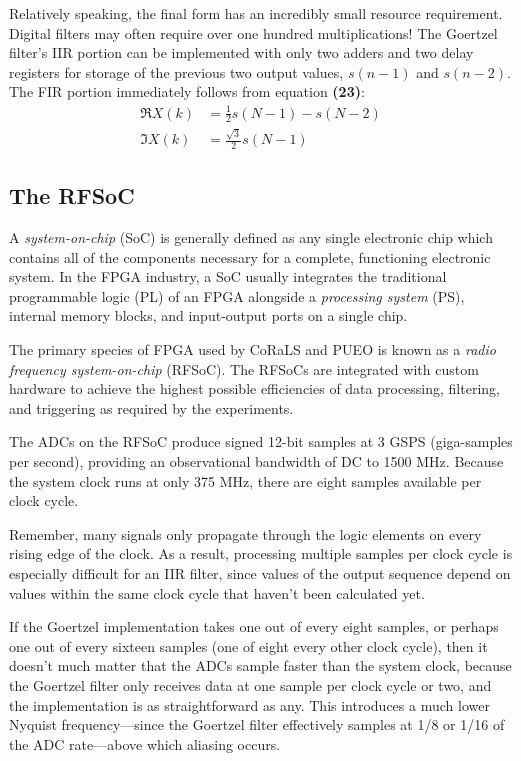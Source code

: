 \documentclass[reprint,amsmath,amssymb,aps,pra]{revtex4-2}
\begin{document}
Relatively speaking, the final form has an incredibly small resource requirement. Digital filters may often require over one hundred multiplications! The Goertzel filter's IIR portion can be implemented with only two adders and two delay registers for storage of the previous two output values, $s(n-1)$ and $s(n-2)$. The FIR portion immediately follows from equation \textbf{(23)}:
\begin{align}
    \Re{X(k)} & = \frac{1}{2} s(N-1) - s(N-2) \nonumber \\ 
    \Im{X(k)} & = \frac{\sqrt{3}}{2} s(N-1)
\end{align}

\subsection{The RFSoC}

A \textit{system-on-chip} (SoC) is generally defined as any single electronic chip which contains all of the components necessary for a complete, functioning electronic system. In the FPGA industry, a SoC usually integrates the traditional programmable logic (PL) of an FPGA alongside a \textit{processing system} (PS), internal memory blocks, and input-output ports on a single chip.

The primary species of FPGA used by CoRaLS and PUEO is known as a \textit{radio frequency system-on-chip} (RFSoC). The RFSoCs are integrated with custom hardware to achieve the highest possible efficiencies of data processing, filtering, and triggering as required by the experiments.

The ADCs on the RFSoC produce signed 12-bit samples at 3 GSPS (giga-samples per second), providing an observational bandwidth of DC to 1500 MHz. Because the system clock runs at only 375 MHz, there are eight samples available per clock cycle.

Remember, many signals only propagate through the logic elements on every rising edge of the clock. As a result, processing multiple samples per clock cycle is especially difficult for an IIR filter, since values of the output sequence depend on values within the same clock cycle that haven't been calculated yet.

If the Goertzel implementation takes one out of every eight samples, or perhaps one out of every sixteen samples (one of eight every other clock cycle), then it doesn't much matter that the ADCs sample faster than the system clock, because the Goertzel filter only receives data at one sample per clock cycle or two, and the implementation is as straightforward as any. This introduces a much lower Nyquist frequency---since the Goertzel filter effectively samples at 1/8 or 1/16 of the ADC rate---above which aliasing occurs.
\end{document}
